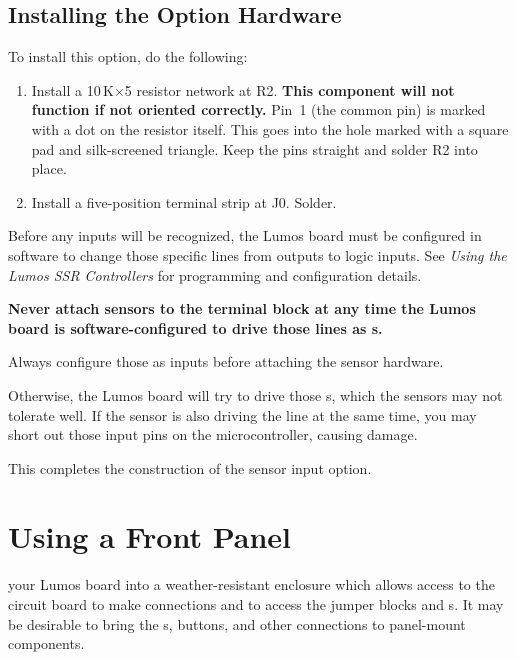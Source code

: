 \documentclass[letterpaper,twoside,onecolumn,openright,final]{memoir}
\begin{document}
\newcommand\SensorConnectorID{J0}
\newcommand\LEDresistorValue{470}


\newpage
\section{Installing the Option Hardware}

To install this option, do the following:
\begin{enumerate}
\item	Install a 10\,K$\times$5 resistor network at R2.  {\bfseries This component will not
	function if not oriented correctly.} Pin~1 (the common pin) is marked with a dot on the 
	resistor itself.  This goes into the hole marked with a square pad and silk-screened 
	triangle.  
	Keep the pins straight and solder R2 into place.
\item	Install a five-position terminal strip at J0.  Solder.
\end{enumerate}

\begin{description}
\item[\HandRight\ Note:] Before any inputs will be recognized, the Lumos board must be configured
in software to change those specific lines from  outputs to logic inputs.  See
\emph{Using the Lumos SSR Controllers} for programming and configuration details.
{\bfseries Never attach sensors to the terminal block at any time the Lumos board is software-configur\-ed
to drive those lines as s.  
\item[\HandRight\ Note:] Always configure those as inputs before attaching the
sensor hardware.} Otherwise, the Lumos board will try to drive those s, which the
sensors may not tolerate well. If the sensor is also driving the line at the same time, you may
short out those input pins on the microcontroller, causing damage.
\end{description}

This completes the construction of the sensor input option.

\chapter{Using a Front Panel}\label{ch:fp}
 your Lumos board
into a weather-resistant enclosure which allows access
to the circuit board to make connections and to access the jumper
blocks and s.
It may be desirable to bring the s, buttons,
and other connections to panel-mount components.
\end{document}

